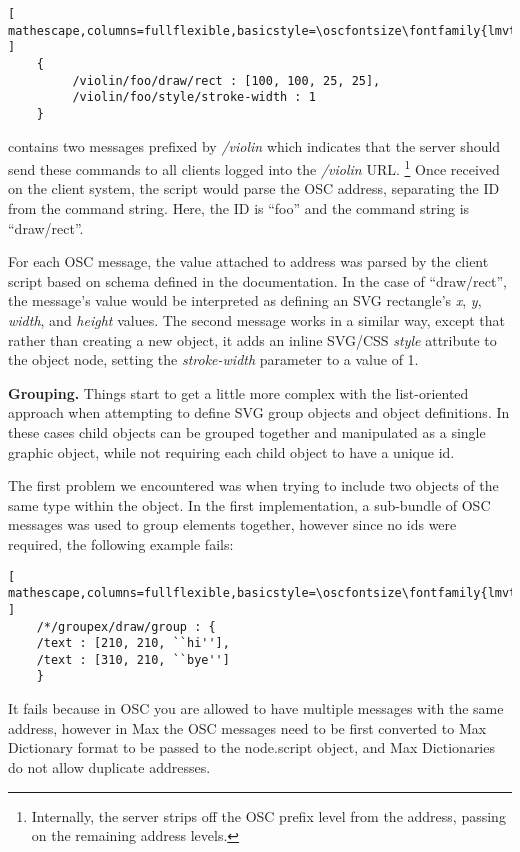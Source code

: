 \begin{lstlisting}[ mathescape,columns=fullflexible,basicstyle=\oscfontsize\fontfamily{lmvtt}\selectfont ]
    {
         /violin/foo/draw/rect : [100, 100, 25, 25],
         /violin/foo/style/stroke-width : 1
    }
\end{lstlisting}

\noindent
contains two messages prefixed by \textit{/violin} which indicates that the server should send these commands to all clients logged into the \textit{/violin} URL. \footnote{Internally, the server strips off the OSC prefix level from the address, passing on the remaining address levels.} 
Once received on the client system, the script would parse the OSC address, separating the ID from the command string. 
Here, the ID is ``foo'' and the command string is ``draw/rect''.

For each OSC message, the value attached to address was parsed by the client script based on schema defined in the documentation.
In the case of ``draw/rect'', the message's value would be interpreted as defining an SVG rectangle's \textit{x},  \textit{y},  \textit{width}, and \textit{height} values.
The second message works in a similar way, except that rather than creating a new object, it adds an inline SVG/CSS \textit{style} attribute to the object node, setting the \textit{stroke-width} parameter to a value of 1.

\medskip
\noindent
\textbf{Grouping.} 
Things start to get a little more complex with the list-oriented approach when attempting to define SVG group objects and object definitions. 
In these cases child objects can be grouped together and manipulated as a single graphic object, while not requiring each child object to have a unique id.

The first problem we encountered was when trying to include two objects of the same type within the object. 
In the first implementation, a sub-bundle of OSC messages was used to group elements together, however since no ids were required, the following example fails:

\begin{lstlisting}[ mathescape,columns=fullflexible,basicstyle=\oscfontsize\fontfamily{lmvtt}\selectfont ]
    /*/groupex/draw/group : {
	/text : [210, 210, ``hi''],
	/text : [310, 210, ``bye'']
    }
\end{lstlisting}

\noindent
It fails because in OSC you are allowed to have multiple messages with the same address, however in Max the OSC messages need to be first converted to Max Dictionary format to be passed to the node.script object, and Max Dictionaries do not allow duplicate addresses.

